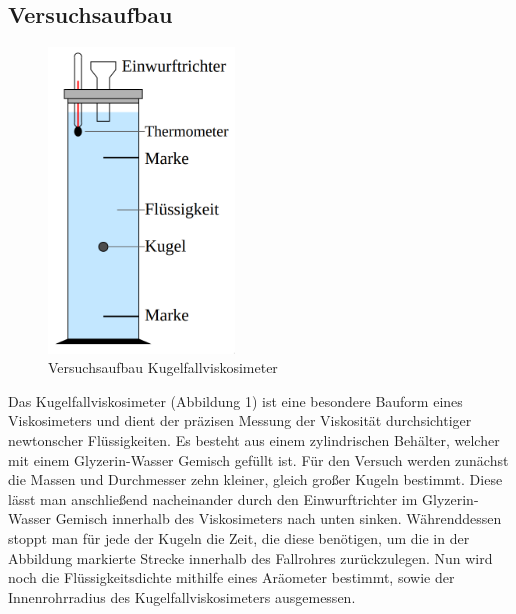 \documentclass{article}
\begin{document}
\subsection{Versuchsaufbau}
\begin{figure}[H]
\centering
\includegraphics[width=140pt]{kugelfall.png}
\caption{Versuchsaufbau Kugelfallviskosimeter \cite{1}}
\label{fig:length_eight_mouse}
\end{figure}
Das Kugelfallviskosimeter (Abbildung 1) ist eine besondere Bauform eines Viskosimeters und dient der präzisen Messung der Viskosität durchsichtiger newtonscher Flüssigkeiten. Es besteht aus einem zylindrischen Behälter, welcher mit einem Glyzerin-Wasser Gemisch gefüllt ist. Für den Versuch werden zunächst die Massen und Durchmesser zehn kleiner, gleich großer Kugeln bestimmt. Diese lässt man anschließend nacheinander durch den Einwurftrichter im Glyzerin-Wasser Gemisch innerhalb des Viskosimeters nach unten sinken. Währenddessen stoppt man für jede der Kugeln die Zeit, die diese benötigen, um die in der Abbildung markierte Strecke innerhalb des Fallrohres zurückzulegen.
Nun wird noch die Flüssigkeitsdichte mithilfe eines Aräometer bestimmt, sowie der Innenrohrradius des Kugelfallviskosimeters ausgemessen.
\newpage
\end{document}
